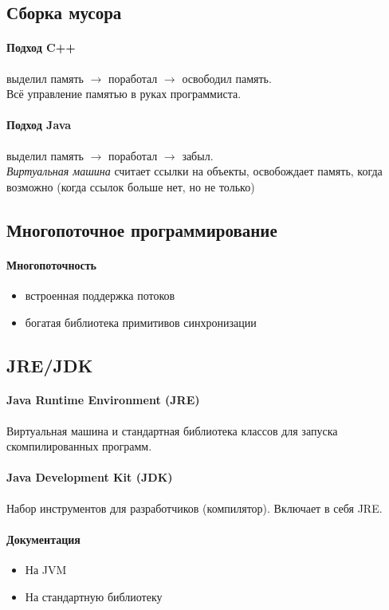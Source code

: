 \subsection{Сборка мусора}
\paragraph{Подход C++}
выделил память $\to$
поработал $\to$
освободил память. \\
Всё управление памятью в руках программиста.

\paragraph{Подход Java}
выделил память $\to$
поработал $\to$
забыл. \\
\emph{Виртуальная машина} считает ссылки на объекты,
освобождает память, когда возможно
(когда ссылок больше нет, но не только)

\subsection{Многопоточное программирование}
\paragraph{Многопоточность}
\begin{itemize}
    \item встроенная поддержка потоков
    \item богатая библиотека примитивов синхронизации
\end{itemize}

\subsection{JRE/JDK}
\paragraph{Java Runtime Environment (JRE)}
Виртуальная машина и стандартная библиотека классов
для запуска скомпилированных программ.

\paragraph{Java Development Kit (JDK)}
Набор инструментов для разработчиков (компилятор).
Включает в себя JRE.

\paragraph{Документация}
\begin{itemize}
    \item На JVM
    \item На стандартную библиотеку
\end{itemize}

